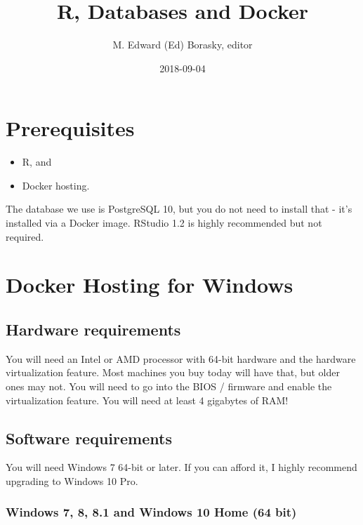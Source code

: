 \documentclass[]{book}
\title{R, Databases and Docker}
\author{M. Edward (Ed) Borasky, editor}
\date{2018-09-04}
\providecommand{\tightlist}{%
  \setlength{\itemsep}{0pt}\setlength{\parskip}{0pt}}
\theoremstyle{definition}
\theoremstyle{definition}
\theoremstyle{definition}
\theoremstyle{remark}
\begin{document}
\maketitle

{
\setcounter{tocdepth}{1}
\tableofcontents
}
\hypertarget{prerequisites}{%
\chapter{Prerequisites}\label{prerequisites}}

\begin{itemize}
\tightlist
\item
  R, and
\item
  Docker hosting.
\end{itemize}

The database we use is PostgreSQL 10, but you do not need to install
that - it's installed via a Docker image. RStudio 1.2 is highly
recommended but not required.

\hypertarget{docker-hosting-for-windows}{%
\chapter{Docker Hosting for Windows}\label{docker-hosting-for-windows}}

\hypertarget{hardware-requirements}{%
\section{Hardware requirements}\label{hardware-requirements}}

You will need an Intel or AMD processor with 64-bit hardware and the
hardware virtualization feature. Most machines you buy today will have
that, but older ones may not. You will need to go into the BIOS /
firmware and enable the virtualization feature. You will need at least 4
gigabytes of RAM!

\hypertarget{software-requirements}{%
\section{Software requirements}\label{software-requirements}}

You will need Windows 7 64-bit or later. If you can afford it, I highly
recommend upgrading to Windows 10 Pro.

\hypertarget{windows-7-8-8.1-and-windows-10-home-64-bit}{%
\subsection{Windows 7, 8, 8.1 and Windows 10 Home (64
bit)}\label{windows-7-8-8.1-and-windows-10-home-64-bit}}
\end{document}
